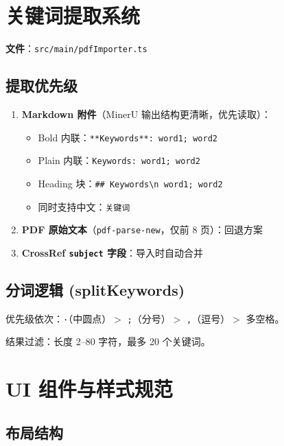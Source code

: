 \documentclass[12pt, a4paper]{article}
\begin{document}
\section{关键词提取系统}

\textbf{文件}：\texttt{src/main/pdfImporter.ts}

\subsection{提取优先级}

\begin{enumerate}[leftmargin=2em, itemsep=2pt]
  \item \textbf{Markdown 附件}（MinerU 输出结构更清晰，优先读取）：
        \begin{itemize}
          \item Bold 内联：\texttt{**Keywords**: word1; word2}
          \item Plain 内联：\texttt{Keywords: word1; word2}
          \item Heading 块：\texttt{\#\# Keywords\textbackslash n word1; word2}
          \item 同时支持中文：\texttt{关键词}
        \end{itemize}
  \item \textbf{PDF 原始文本}（\texttt{pdf-parse-new}，仅前 8 页）：回退方案
  \item \textbf{CrossRef \texttt{subject} 字段}：导入时自动合并
\end{enumerate}

\subsection{分词逻辑 (splitKeywords)}

优先级依次：\texttt{·}（中圆点）$>$ \texttt{;}（分号）$>$ \texttt{,}（逗号）$>$ 多空格。

结果过滤：长度 2--80 字符，最多 20 个关键词。

\section{UI 组件与样式规范}

\subsection{布局结构}
\end{document}
